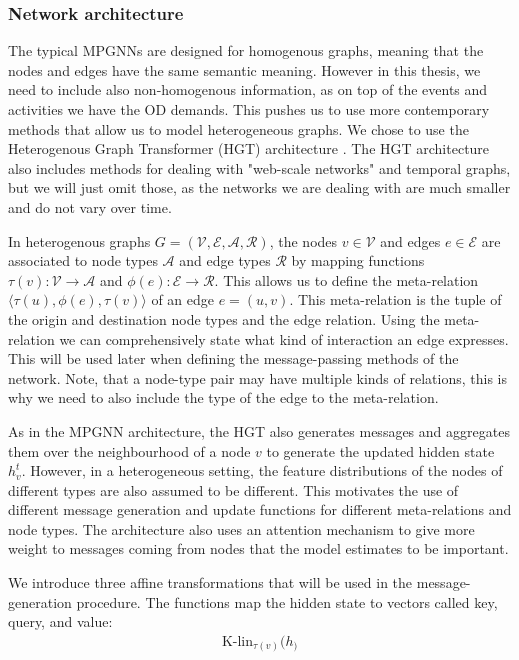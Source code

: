 \documentclass[english, 12pt, a4paper, sci, utf8, a-2b, online]{aaltothesis}
\newcommand{\Klin}{\textrm{K-lin}}
\begin{document}
\subsubsection{Network architecture}

The typical MPGNNs are designed for homogenous graphs, meaning that the nodes and edges have the same semantic meaning. However in this thesis, we need to include also non-homogenous information, as on top of the events and activities we have the OD demands. This pushes us to use more contemporary methods that allow us to model heterogeneous graphs. We chose to use the Heterogenous Graph Transformer (HGT) architecture \cite{hgt-2020}. The HGT architecture also includes methods for dealing with "web-scale networks" and temporal graphs, but we will just omit those, as the networks we are dealing with are much smaller and do not vary over time.

In heterogenous graphs $G = (\mathcal{V}, \mathcal{E}, \mathcal{A}, \mathcal{R})$, the nodes $v \in \mathcal{V}$ and edges $e \in \mathcal{E}$ are associated to node types $\mathcal{A}$ and edge types $\mathcal{R}$ by mapping functions $\tau(v): \mathcal{V} \to \mathcal{A}$ and $\phi(e): \mathcal{E} \to \mathcal{R}$. This allows us to define the meta-relation $\langle \tau(u), \phi(e), \tau(v)\rangle$ of an edge $e=(u,v)$. This meta-relation is the tuple of the origin and destination node types and the edge relation. Using the meta-relation we can comprehensively state what kind of interaction an edge expresses. This will be used later when defining the message-passing methods of the network. Note, that a node-type pair may have multiple kinds of relations, this is why we need to also include the type of the edge to the meta-relation.

As in the MPGNN architecture, the HGT also generates messages and aggregates them over the neighbourhood of a node $v$ to generate the updated hidden state $h_v^t$. However, in a heterogeneous setting, the feature distributions of the nodes of different types are also assumed to be different. This motivates the use of different message generation and update functions for different meta-relations and node types. The architecture also uses an attention mechanism to give more weight to messages coming from nodes that the model estimates to be important.

We introduce three affine transformations that will be used in the message-generation procedure. The functions map the hidden state to vectors called key, query, and value:
\begin{align}
    \Klin_{\tau(v)}(h_)
\end{align}
\end{document}
